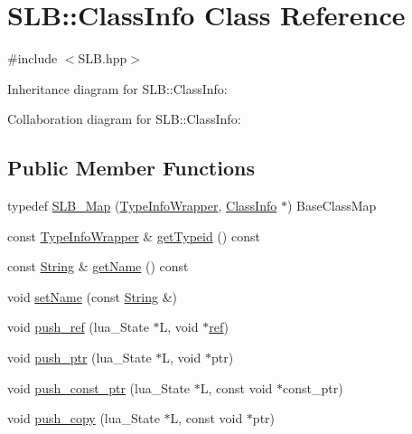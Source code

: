 \hypertarget{classSLB_1_1ClassInfo}{}\section{S\+LB\+:\+:Class\+Info Class Reference}
\label{classSLB_1_1ClassInfo}


{\ttfamily \#include $<$S\+L\+B.\+hpp$>$}



Inheritance diagram for S\+LB\+:\+:Class\+Info\+:


Collaboration diagram for S\+LB\+:\+:Class\+Info\+:
\subsection*{Public Member Functions}
\begin{DoxyCompactItemize}
\item 
typedef \hyperlink{classSLB_1_1ClassInfo_aea31f4ab48cacef0d03fa155def9075a}{S\+L\+B\+\_\+\+Map} (\hyperlink{classSLB_1_1TypeInfoWrapper}{Type\+Info\+Wrapper}, \hyperlink{classSLB_1_1ClassInfo}{Class\+Info} $\ast$) Base\+Class\+Map
\item 
const \hyperlink{classSLB_1_1TypeInfoWrapper}{Type\+Info\+Wrapper} \& \hyperlink{classSLB_1_1ClassInfo_a8ae743b522ec187f1c69339624705581}{get\+Typeid} () const 
\item 
const \hyperlink{namespaceSLB_a6a4c36e7004d99c0535c2c91c200c9a1}{String} \& \hyperlink{classSLB_1_1ClassInfo_af68ed9e9cc0a3df99e58ec7bee96ac7c}{get\+Name} () const 
\item 
void \hyperlink{classSLB_1_1ClassInfo_afcb6923d7e355213b0071bdd526f75c7}{set\+Name} (const \hyperlink{namespaceSLB_a6a4c36e7004d99c0535c2c91c200c9a1}{String} \&)
\item 
void \hyperlink{classSLB_1_1ClassInfo_a26cda3371f0ce94121feca24949e4ccd}{push\+\_\+ref} (lua\+\_\+\+State $\ast$L, void $\ast$\hyperlink{classSLB_1_1Object_ae2da306891334eb87b40d4b39c9edc2a}{ref})
\item 
void \hyperlink{classSLB_1_1ClassInfo_aec0a219123bf04bad38fef3eda47eb7d}{push\+\_\+ptr} (lua\+\_\+\+State $\ast$L, void $\ast$ptr)
\item 
void \hyperlink{classSLB_1_1ClassInfo_ad592a1f917399cd7999ee7929d088728}{push\+\_\+const\+\_\+ptr} (lua\+\_\+\+State $\ast$L, const void $\ast$const\+\_\+ptr)
\item 
void \hyperlink{classSLB_1_1ClassInfo_a1299acd4fc2f83c27947ba9c9b4aecc6}{push\+\_\+copy} (lua\+\_\+\+State $\ast$L, const void $\ast$ptr)

\end{DoxyCompactItemize}
